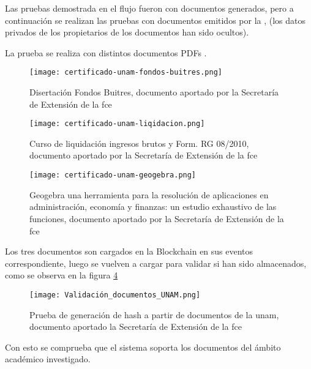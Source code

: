 Las pruebas demostrada en el flujo fueron con documentos generados, pero a continuación se 
realizan las pruebas con documentos emitidos por la , (los datos privados de los propietarios 
de los documentos han sido ocultos).

La  prueba se realiza con distintos  documentos PDFs .
\begin{figure}[H]
  \centering
  {\texttt{[image: certificado-unam-fondos-buitres.png]}}
  \caption{Disertación Fondos Buitres, documento aportado por la Secretaría de Extensión de la \gls{fce} \cite[]{larraburu_secretariextension_2020}}
  \label{img:certificado-unam-fondos-buitres}
\end{figure}

\begin{figure}[H]
  \centering
  {\texttt{[image: certificado-unam-liqidacion.png]}}
  \caption{Curso de liquidación ingresos brutos y Form. RG 08/2010, documento aportado por la Secretaría de Extensión de la \gls{fce} \cite[]{larraburu_secretariextension_2020}}
  \label{img:certificado-unam-liqidacion}
\end{figure}

\begin{figure}[H]
  \centering
  {\texttt{[image: certificado-unam-geogebra.png]}}
  \caption{Geogebra una herramienta para la resolución de aplicaciones en administración, economía y
  finanzas: un estudio exhaustivo de las funciones, documento aportado por la Secretaría de Extensión de la \gls{fce} \cite[]{larraburu_secretariextension_2020}}
  \label{img:certificado-unam-geogebra}
\end{figure}

Los tres documentos son cargados en la  Blockchain en sus eventos correspondiente, luego se vuelven a cargar
para validar si han sido almacenados, como se observa en la figura \ref{img:Validacion_documentos_UNAM}

\begin{figure}[H]
  \centering
  {\texttt{[image: Validación\_documentos\_UNAM.png]}}
  \caption{Prueba de generación de hash a partir de documentos de la \gls{unam}, documento aportado la Secretaría de Extensión de la \gls{fce} \cite[]{larraburu_secretariextension_2020}}
  \label{img:Validacion_documentos_UNAM}
\end{figure}

Con esto se comprueba que el sistema soporta los documentos del ámbito académico investigado.



